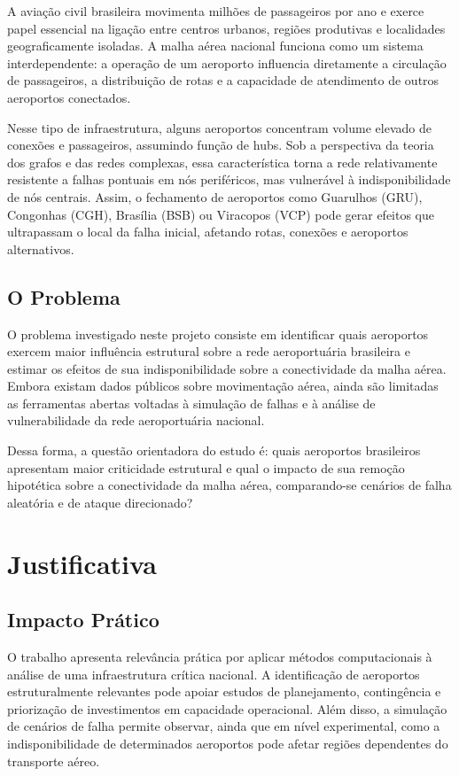 \documentclass[12pt,a4paper]{article}
\begin{document}
A aviação civil brasileira movimenta milhões de passageiros por ano e exerce papel essencial na
ligação entre centros urbanos, regiões produtivas e localidades geograficamente isoladas. A malha
aérea nacional funciona como um sistema interdependente: a operação de um aeroporto influencia
diretamente a circulação de passageiros, a distribuição de rotas e a capacidade de atendimento de
outros aeroportos conectados.

Nesse tipo de infraestrutura, alguns aeroportos concentram volume elevado de conexões e
passageiros, assumindo função de hubs. Sob a perspectiva da teoria dos grafos e das redes
complexas, essa característica torna a rede relativamente resistente a falhas pontuais em nós
periféricos, mas vulnerável à indisponibilidade de nós centrais. Assim, o fechamento de aeroportos
como Guarulhos (GRU), Congonhas (CGH), Brasília (BSB) ou Viracopos (VCP) pode gerar efeitos que
ultrapassam o local da falha inicial, afetando rotas, conexões e aeroportos alternativos.

\subsection{O Problema}

O problema investigado neste projeto consiste em identificar quais aeroportos exercem maior
influência estrutural sobre a rede aeroportuária brasileira e estimar os efeitos de sua
indisponibilidade sobre a conectividade da malha aérea. Embora existam dados públicos sobre
movimentação aérea, ainda são limitadas as ferramentas abertas voltadas à simulação de falhas e
à análise de vulnerabilidade da rede aeroportuária nacional.

Dessa forma, a questão orientadora do estudo é: quais aeroportos brasileiros apresentam maior
criticidade estrutural e qual o impacto de sua remoção hipotética sobre a conectividade da malha
aérea, comparando-se cenários de falha aleatória e de ataque direcionado?

\section{Justificativa}

\subsection{Impacto Prático}

O trabalho apresenta relevância prática por aplicar métodos computacionais à análise de uma
infraestrutura crítica nacional. A identificação de aeroportos estruturalmente relevantes pode
apoiar estudos de planejamento, contingência e priorização de investimentos em capacidade
operacional. Além disso, a simulação de cenários de falha permite observar, ainda que em nível
experimental, como a indisponibilidade de determinados aeroportos pode afetar regiões
dependentes do transporte aéreo.
\end{document}

